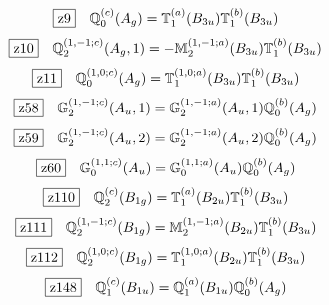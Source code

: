 \documentclass[fleqn,10pt,landscape]{jsarticle}
\begin{document}
\begin{dmath*}
\hspace*{3mm}\fbox{z9}\quad \mathbb{Q}_{0}^{(c)}(A_{g})=\mathbb{T}_{1}^{(a)}(B_{3u}) \mathbb{T}_{1}^{(b)}(B_{3u})
\end{dmath*}
\begin{dmath*}
\hspace*{3mm}\fbox{z10}\quad \mathbb{Q}_{2}^{(1,-1;c)}(A_{g},1)=- \mathbb{M}_{2}^{(1,-1;a)}(B_{3u}) \mathbb{T}_{1}^{(b)}(B_{3u})
\end{dmath*}
\begin{dmath*}
\hspace*{3mm}\fbox{z11}\quad \mathbb{Q}_{0}^{(1,0;c)}(A_{g})=\mathbb{T}_{1}^{(1,0;a)}(B_{3u}) \mathbb{T}_{1}^{(b)}(B_{3u})
\end{dmath*}
\begin{dmath*}
\hspace*{3mm}\fbox{z58}\quad \mathbb{G}_{2}^{(1,-1;c)}(A_{u},1)=\mathbb{G}_{2}^{(1,-1;a)}(A_{u},1) \mathbb{Q}_{0}^{(b)}(A_{g})
\end{dmath*}
\begin{dmath*}
\hspace*{3mm}\fbox{z59}\quad \mathbb{G}_{2}^{(1,-1;c)}(A_{u},2)=\mathbb{G}_{2}^{(1,-1;a)}(A_{u},2) \mathbb{Q}_{0}^{(b)}(A_{g})
\end{dmath*}
\begin{dmath*}
\hspace*{3mm}\fbox{z60}\quad \mathbb{G}_{0}^{(1,1;c)}(A_{u})=\mathbb{G}_{0}^{(1,1;a)}(A_{u}) \mathbb{Q}_{0}^{(b)}(A_{g})
\end{dmath*}
\begin{dmath*}
\hspace*{3mm}\fbox{z110}\quad \mathbb{Q}_{2}^{(c)}(B_{1g})=\mathbb{T}_{1}^{(a)}(B_{2u}) \mathbb{T}_{1}^{(b)}(B_{3u})
\end{dmath*}
\begin{dmath*}
\hspace*{3mm}\fbox{z111}\quad \mathbb{Q}_{2}^{(1,-1;c)}(B_{1g})=\mathbb{M}_{2}^{(1,-1;a)}(B_{2u}) \mathbb{T}_{1}^{(b)}(B_{3u})
\end{dmath*}
\begin{dmath*}
\hspace*{3mm}\fbox{z112}\quad \mathbb{Q}_{2}^{(1,0;c)}(B_{1g})=\mathbb{T}_{1}^{(1,0;a)}(B_{2u}) \mathbb{T}_{1}^{(b)}(B_{3u})
\end{dmath*}
\begin{dmath*}
\hspace*{3mm}\fbox{z148}\quad \mathbb{Q}_{1}^{(c)}(B_{1u})=\mathbb{Q}_{1}^{(a)}(B_{1u}) \mathbb{Q}_{0}^{(b)}(A_{g})
\end{dmath*}
\end{document}
